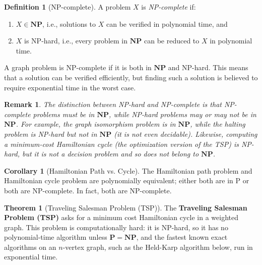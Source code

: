 \documentclass{article}
\newtheorem{remark}{Remark}
\theoremstyle{definition}
\newtheorem{theorem}{Theorem}
\newtheorem{corollary}{Corollary}
\newtheorem{definition}{Definition}
\begin{document}
\begin{definition}[NP-complete]
A problem $X$ is \emph{NP-complete} if:
\begin{enumerate}
    \item $X \in \mathbf{NP}$, i.e., solutions to $X$ can be verified in polynomial time, and
    \item $X$ is NP-hard, i.e., every problem in $\mathbf{NP}$ can be reduced to $X$ in polynomial time.
\end{enumerate}

A graph problem is NP-complete if it is both in $\mathbf{NP}$ and NP-hard. This means that a solution can be verified efficiently, but finding such a solution is believed to require exponential time in the worst case.
\end{definition}

\begin{remark}
The distinction between NP-hard and NP-complete is that NP-complete problems must be in $\mathbf{NP}$, while NP-hard problems may or may not be in $\mathbf{NP}$. For example, the graph isomorphism problem is in $\mathbf{NP}$, while the halting problem is NP-hard but not in $\mathbf{NP}$ (it is not even decidable). Likewise, computing a minimum-cost Hamiltonian cycle (the optimization version of the TSP) is NP-hard, but it is not a decision problem and so does not belong to $\mathbf{NP}$.
\end{remark}

\begin{corollary}[Hamiltonian Path vs. Cycle]
The Hamiltonian path problem and Hamiltonian cycle problem are polynomially equivalent; either both are in P or both are NP-complete. In fact, both are NP-complete.
\end{corollary}

\begin{theorem}[Traveling Salesman Problem (TSP)]
The \textbf{Traveling Salesman Problem (TSP)} asks for a minimum cost Hamiltonian cycle in a
weighted graph. This problem is computationally hard: it is NP-hard, so it has no polynomial-time algorithm unless $\mathbf{P} = \mathbf{NP}$, and the fastest known exact algorithms on an $n$-vertex graph, such as the Held-Karp algorithm below, run in
exponential time.
\end{theorem}
\end{document}
